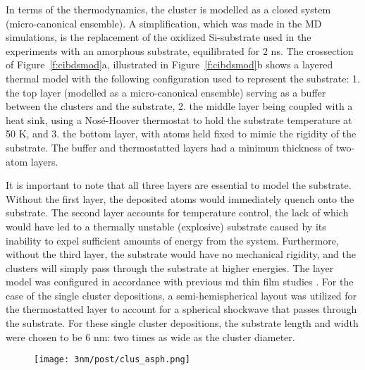 \begin{changebar}
In terms of the thermodynamics, the cluster is modelled as a closed system (micro-canonical ensemble). A simplification, which was made in the MD simulations, is the replacement of the oxidized Si-substrate used in the experiments \cite{Benel2018,Benel2019} with an amorphous \cz  substrate, equilibrated for 2 ns. The crossection of Figure~\ref{f:cibdsmod}a, illustrated in Figure~\ref{f:cibdsmod}b shows a layered thermal model with the following configuration used to represent the substrate: 1. the top layer (modelled as a micro-canonical ensemble) serving as a buffer between the clusters and the substrate, 2. the middle layer being coupled with a heat sink, using a Nosé-Hoover thermostat to hold the substrate temperature at 50 K, and 3. the bottom layer, with atoms held fixed to mimic the rigidity of the substrate. The buffer and thermostatted layers had a minimum thickness of two-atom layers. \par 

It is important to note that all three layers are essential to model the substrate. Without the first layer, the deposited atoms would immediately quench onto the substrate. The second layer accounts for temperature control, the lack of which would have led to a thermally unstable (explosive) substrate caused by its inability to expel sufficient amounts of energy from the system. Furthermore, without the third layer, the substrate would have no mechanical rigidity, and the clusters will simply pass through the substrate at higher energies. The layer model was configured in accordance with previous \gls{md} thin film studies \cite{Haberland1993,Haberland1995,Rahmati2020}. For the case of the single cluster depositions, a semi-hemispherical layout was utilized for the thermostatted layer to account for a spherical shockwave that passes through the substrate. For these single cluster depositions, the substrate length and width were chosen to be 6 nm: two times as wide as the cluster diameter. \par

\begin{figure}[!h]
\centering
\texttt{[image: 3nm/post/clus\_asph.png]}
\label{f:cibdsasph}
\end{figure}%


\end{changebar}
